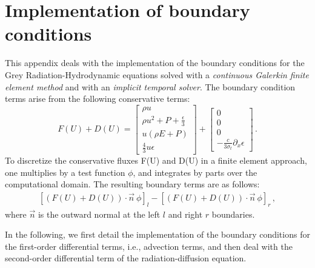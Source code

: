 \section{Implementation of boundary conditions} \label{App:AppendixA}

This appendix deals with the implementation of the boundary conditions for the Grey Radiation-Hydrodynamic equations solved with a \emph{continuous Galerkin finite element method} and with an \emph{implicit temporal solver}. The boundary condition terms arise from the following conservative terms:
%
\begin{equation}\label{eq:bc-fluxes}
F(U) + D(U) = 
\begin{bmatrix}
\rho u \\
\rho u^2 + P + \frac{\epsilon}{3} \\
u \left( \rho E + P \right) \\
\frac{4}{3} u \epsilon
\end{bmatrix}
+  
\begin{bmatrix}
0 \\
0 \\
0 \\
- \frac{c}{3 \sigma_t} \partial_x \epsilon
\end{bmatrix}
\,.
\end{equation}
%
To discretize the conservative fluxes F(U) and D(U) in a finite element approach, one multiplies by a test function $\phi$, and integrates by parts over the computational domain. The resulting boundary terms are as follows:
%
\begin{eqnarray}
\left[\left(F(U)+D(U)\right) \cdot \vec{n} \ \phi \right]_{l} - \left[ \left(F(U)+D(U)\right) \cdot \vec{n} \ \phi \right]_{r} \, ,
\end{eqnarray}
%
where $\vec{n}$ is the outward normal at the left $l$ and right $r$ boundaries.

In the following, we first detail the implementation of the boundary conditions for the first-order differential terms, i.e., advection terms, and then deal with the second-order differential term of the radiation-diffusion equation. 
%
%
